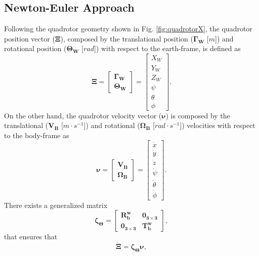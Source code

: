 \subsection{Newton-Euler Approach}
Following the quadrotor geometry shown in Fig. \ref{fig:quadrotorX}, the quadrotor position vector ($\mathbf{\Xi}$), composed by the translational position ($\mathbf{\Gamma_W}$ [$m$]) and rotational position ($\mathbf{\Theta_W}$ [$rad$]) with respect to the earth-frame, is defined as
\begin{equation}
\mathbf{\Xi} = \begin{bmatrix}
\mathbf{\Gamma_W} \\ \mathbf{\Theta_W}
\end{bmatrix} = \begin{bmatrix}
X_W \\ Y_W \\ Z_W \\ \psi \\ \theta \\ \phi
\end{bmatrix}.
\end{equation}
On the other hand, the quadrotor velocity vector ($\mathbf{\nu}$) is composed by the translational ($\mathbf{V_B}$ [$m\cdot s^{-1}$]) and rotational ($\mathbf{\Omega_B}$ [$rad\cdot s^{-1}$]) velocities with respect to the body-frame as
\begin{equation}
\mathbf{\nu} = \begin{bmatrix}
\mathbf{V_B} \\ \mathbf{\Omega_B}
\end{bmatrix} =
\begin{bmatrix}
\dot{x} \\ \dot{y} \\ \dot{z} \\ \dot{\psi} \\ \dot{\theta} \\ \dot{\phi}
\end{bmatrix}.
\end{equation}
There exists a generalized matrix
\begin{equation}
\mathbf{\zeta_\Theta} = \begin{bmatrix}
\mathbf{R_{b}^{w}} & \mathbf{0_{3\times 3}} \\
\mathbf{0_{3\times 3}} & \mathbf{T_{b}^{w}}
\end{bmatrix},
\end{equation}
that ensures that
\begin{equation}
\mathbf{\dot{\Xi}} = \mathbf{\zeta_\Theta}\mathbf{\nu},
\end{equation}
